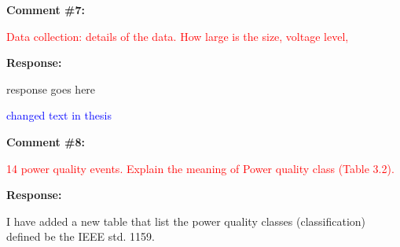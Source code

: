 \documentclass[journal]{IEEEtran}
\begin{document}
\vspace{30pt}
\textbf{Comment \#7:}
\begin{adjustwidth}{2.5em}{0pt}
\singlespacing \vspace{-10pt}
\textcolor{red}{Data collection: details of the data. How large is the size, voltage level,}
\end{adjustwidth}

\vspace{10pt}
\textbf{Response:}
\begin{adjustwidth}{2.5em}{0pt}
response goes here

\vspace{10pt}
\noindent\textcolor{blue}{changed text in thesis}
\end{adjustwidth}


\vspace{30pt}
\textbf{Comment \#8:}
\begin{adjustwidth}{2.5em}{0pt}
\singlespacing \vspace{-10pt}
\textcolor{red}{14 power quality events. Explain the meaning of Power quality class (Table 3.2).}
\end{adjustwidth}

\vspace{10pt}
\textbf{Response:}
\begin{adjustwidth}{2.5em}{0pt}
I have added a new table that list the power quality classes (classification) defined be the IEEE std. 1159.
\end{adjustwidth}
\end{document}
